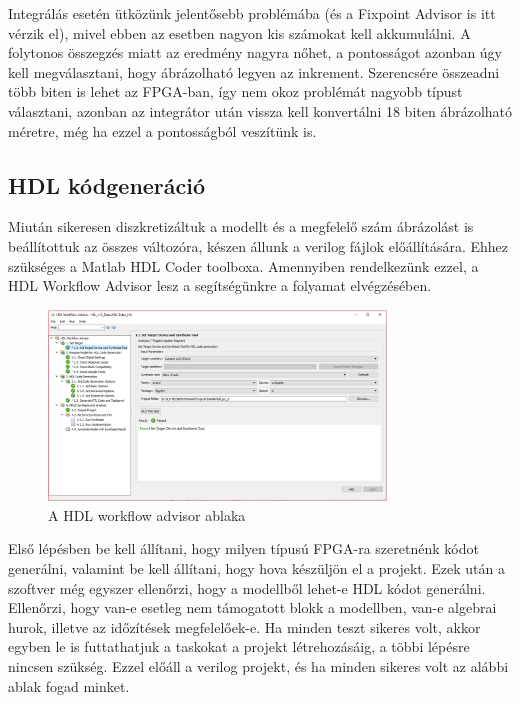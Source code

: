 Integrálás esetén ütközünk jelentősebb problémába (és a Fixpoint Advisor is itt vérzik el), mivel ebben az esetben nagyon kis számokat kell akkumulálni. A folytonos összegzés miatt az eredmény nagyra nőhet, a pontosságot azonban úgy kell megválasztani, hogy ábrázolható legyen az inkrement. Szerencsére összeadni több biten is lehet az FPGA-ban, így nem okoz problémát nagyobb típust választani, azonban az integrátor után vissza kell konvertálni 18 biten ábrázolható méretre, még ha ezzel a pontosságból veszítünk is.

\subsection{HDL kódgeneráció}

Miután sikeresen diszkretizáltuk a modellt és a megfelelő szám ábrázolást is beállítottuk az összes változóra, készen állunk a verilog fájlok előállítására. Ehhez szükséges a Matlab HDL Coder toolboxa. Amennyiben rendelkezünk ezzel, a HDL Workflow Advisor lesz a segítségünkre a folyamat elvégzésében.

\begin{figure}[h!]
	\centering
	\includegraphics[width = 0.8\textwidth]{figures/hdl_advisor.png}
	\caption{A HDL workflow advisor ablaka} 
	\label{fig:hdl_advisor}
\end{figure}

Első lépésben be kell állítani, hogy milyen típusú FPGA-ra szeretnénk kódot generálni, valamint be kell állítani, hogy hova készüljön el a projekt. Ezek után a szoftver még egyszer ellenőrzi, hogy a modellből lehet-e HDL kódot generálni. Ellenőrzi, hogy van-e esetleg nem támogatott blokk a modellben, van-e algebrai hurok, illetve az időzítések megfelelőek-e. Ha minden teszt sikeres volt, akkor egyben le is futtathatjuk a taskokat a projekt létrehozásáig, a többi lépésre nincsen szükség. Ezzel előáll a verilog projekt, és ha minden sikeres volt az alábbi ablak fogad minket.

